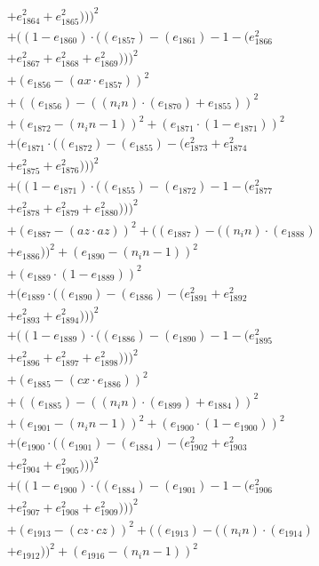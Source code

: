 \documentclass[10pt, a4paper]{article}
\begin{document}
\begin{small}
\begin{align*}
& + e_{1864}^{2} + e_{1865}^{2})))^{2} \\
& + ((1 - e_{1860})  \cdot  ((e_{1857}) - (e_{1861}) - 1 - (e_{1866}^{2} \\
& + e_{1867}^{2} + e_{1868}^{2} + e_{1869}^{2})))^{2} \\
& + (e_{1856} - (ax  \cdot  e_{1857}))^{2} \\
& + ((e_{1856}) - ((n_in)  \cdot  (e_{1870}) + e_{1855}))^{2} \\
& + (e_{1872} - (n_in - 1))^{2} + (e_{1871}  \cdot  (1 - e_{1871}))^{2} \\
& + (e_{1871}  \cdot  ((e_{1872}) - (e_{1855}) - (e_{1873}^{2} + e_{1874}^{2} \\
& + e_{1875}^{2} + e_{1876}^{2})))^{2} \\
& + ((1 - e_{1871})  \cdot  ((e_{1855}) - (e_{1872}) - 1 - (e_{1877}^{2} \\
& + e_{1878}^{2} + e_{1879}^{2} + e_{1880}^{2})))^{2} \\
& + (e_{1887} - (az  \cdot  az))^{2} + ((e_{1887}) - ((n_in)  \cdot  (e_{1888}) \\
& + e_{1886}))^{2} + (e_{1890} - (n_in - 1))^{2} \\
& + (e_{1889}  \cdot  (1 - e_{1889}))^{2} \\
& + (e_{1889}  \cdot  ((e_{1890}) - (e_{1886}) - (e_{1891}^{2} + e_{1892}^{2} \\
& + e_{1893}^{2} + e_{1894}^{2})))^{2} \\
& + ((1 - e_{1889})  \cdot  ((e_{1886}) - (e_{1890}) - 1 - (e_{1895}^{2} \\
& + e_{1896}^{2} + e_{1897}^{2} + e_{1898}^{2})))^{2} \\
& + (e_{1885} - (cx  \cdot  e_{1886}))^{2} \\
& + ((e_{1885}) - ((n_in)  \cdot  (e_{1899}) + e_{1884}))^{2} \\
& + (e_{1901} - (n_in - 1))^{2} + (e_{1900}  \cdot  (1 - e_{1900}))^{2} \\
& + (e_{1900}  \cdot  ((e_{1901}) - (e_{1884}) - (e_{1902}^{2} + e_{1903}^{2} \\
& + e_{1904}^{2} + e_{1905}^{2})))^{2} \\
& + ((1 - e_{1900})  \cdot  ((e_{1884}) - (e_{1901}) - 1 - (e_{1906}^{2} \\
& + e_{1907}^{2} + e_{1908}^{2} + e_{1909}^{2})))^{2} \\
& + (e_{1913} - (cz  \cdot  cz))^{2} + ((e_{1913}) - ((n_in)  \cdot  (e_{1914}) \\
& + e_{1912}))^{2} + (e_{1916} - (n_in - 1))^{2} \\

\end{align*}
\end{small}
\end{document}
